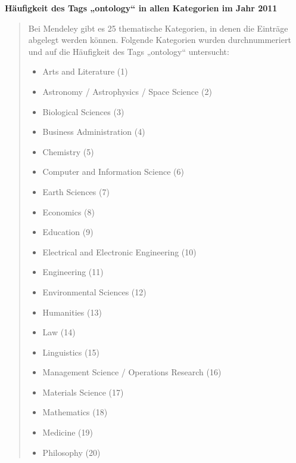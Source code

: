 \documentclass[letterpaper,10pt,english]{sphinxmanual}
\begin{document}
\textbf{Häufigkeit des Tags „ontology“ in allen Kategorien im Jahr 2011}
\begin{quote}

Bei Mendeley gibt es 25 thematische Kategorien, in denen die Einträge abgelegt werden können. Folgende Kategorien wurden durchnummeriert und auf die Häufigkeit des Tags „ontology“ untersucht:
\begin{itemize}
\item {} 
Arts and Literature (1)

\item {} 
Astronomy / Astrophysics / Space Science (2)

\item {} 
Biological Sciences (3)

\item {} 
Business Administration (4)

\item {} 
Chemistry (5)

\item {} 
Computer and Information Science (6)

\item {} 
Earth Sciences (7)

\item {} 
Economics (8)

\item {} 
Education (9)

\item {} 
Electrical and Electronic Engineering (10)

\item {} 
Engineering (11)

\item {} 
Environmental Sciences (12)

\item {} 
Humanities (13)

\item {} 
Law (14)

\item {} 
Linguistics (15)

\item {} 
Management Science / Operations Research (16)

\item {} 
Materials Science (17)

\item {} 
Mathematics (18)

\item {} 
Medicine (19)

\item {} 
Philosophy (20)


\end{itemize}
\end{quote}
\end{document}
